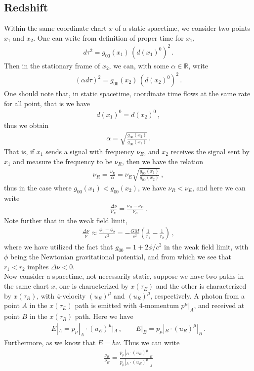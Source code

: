 \documentclass[11pt, onesided]{book}
\theoremstyle{break}
\theoremstyle{break}
\newcommand{\R}{\mathbb{R}}
\begin{document}
\subsection{Redshift}
Within the same coordinate chart $x$ of a static spacetime, we consider two points $x_1$ and $x_2$. One can write from definition of proper time for $x_1$, 
\begin{align*}
d\tau^2 = g_{00}(x_1) \, (d(x_1)^0)^2\,.
\end{align*}
Then in the stationary frame of $x_2$, we can, with some $\alpha \in \R$, write
\begin{align*}
(\alpha d\tau)^2 = g_{00}(x_2) \, (d(x_2)^0)^2 \,.
\end{align*}
One should note that, in static spacetime, coordinate time flows at the same rate for all point, that is we have
\begin{align*}
d(x_1)^0 = d(x_2)^0\,,
\end{align*}
thus we obtain
\begin{align*}
\alpha = \sqrt{\frac{g_{00}(x_2)}{g_{00}(x_1)}}\,.
\end{align*}
That is, if $x_1$ sends a signal with frequency $\nu_E$, and $x_2$ receives the signal sent by $x_1$ and measure the frequency to be $\nu_R$, then we have the relation
\begin{align*}
\nu_R = \frac{\nu_E}{\alpha} = \nu_E\sqrt{\frac{g_{00}(x_1)}{g_{00}(x_2)}}\,,
\end{align*}
thus in the case where $g_{00}(x_1) < g_{00}(x_2)$, we have $\nu_R < \nu_E$, and here we can write
\begin{align*}
\frac{\Delta \nu}{\nu_E} = \frac{\nu_R - \nu_E}{\nu_E}\,.
\end{align*}
Note further that in the weak field limit,
\begin{align*}
\frac{\Delta \nu}{\nu} \approx \frac{\phi_1 - \phi_2}{c^2} = -\frac{GM}{c^2}\left( \frac{1}{r_1} - \frac{1}{r_2}\right)\,,
\end{align*}
where we have utilized the fact that $g_{00} = 1 + 2\phi/c^2$ in the weak field limit, with $\phi$ being the Newtonian gravitational potential, and from which we see that $r_1 < r_2$ implies $\Delta \nu <0$. \\


Now consider a spacetime, not necessarily static, suppose we have two paths in the same chart $x$, one is characterized by $x(\tau_E)$ and the other is characterized by $x(\tau_R)$, with $4$-velocity $(u_E)^\mu$ and $(u_R)^\mu$, respectively. A photon from a point $A$ in the $x(\tau_E)$ path is emitted with $4$-momentum $p^\mu|_A$, and received at point $B$ in the $x(\tau_R)$ path. Here we have 
\begin{align*}
E|_A = p_\mu|_A \cdot (u_E)^\mu|_A \,,\qquad
E|_B = p_\mu|_B \cdot (u_R)^\mu|_B\,.
\end{align*}
Furthermore, as we know that $E = h\nu$. Thus we can write
\begin{align*}
\frac{\nu_R}{\nu_E} = \frac{p_\mu|_B \cdot (u_R)^\mu|_B}{p_\mu|_A \cdot (u_E)^\mu|_A}
\end{align*}
\end{document}
